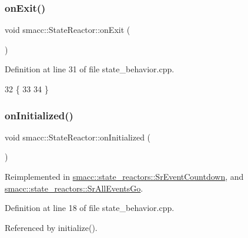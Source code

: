 \subsubsection{\texorpdfstring{on\+Exit()}{onExit()}}
{\footnotesize\ttfamily void smacc\+::\+State\+Reactor\+::on\+Exit (\begin{DoxyParamCaption}{ }\end{DoxyParamCaption})\hspace{0.3cm}{\ttfamily [virtual]}}



Definition at line 31 of file state\+\_\+behavior.\+cpp.


\begin{DoxyCode}
32 \{
33 
34 \}
\end{DoxyCode}
\mbox{\label{classsmacc_1_1StateReactor_aa10b2c6b7d1e80f01b00cbdac526a2bf}} 
\subsubsection{\texorpdfstring{on\+Initialized()}{onInitialized()}}
{\footnotesize\ttfamily void smacc\+::\+State\+Reactor\+::on\+Initialized (\begin{DoxyParamCaption}{ }\end{DoxyParamCaption})\hspace{0.3cm}{\ttfamily [virtual]}}



Reimplemented in \hyperlink{classsmacc_1_1state__reactors_1_1SrEventCountdown_a1bd7afbf283ade29f9305f0c3a64ef94}{smacc\+::state\+\_\+reactors\+::\+Sr\+Event\+Countdown}, and \hyperlink{classsmacc_1_1state__reactors_1_1SrAllEventsGo_adda075f2b3ec56115d02e9fb1a1c26fe}{smacc\+::state\+\_\+reactors\+::\+Sr\+All\+Events\+Go}.



Definition at line 18 of file state\+\_\+behavior.\+cpp.



Referenced by initialize().


